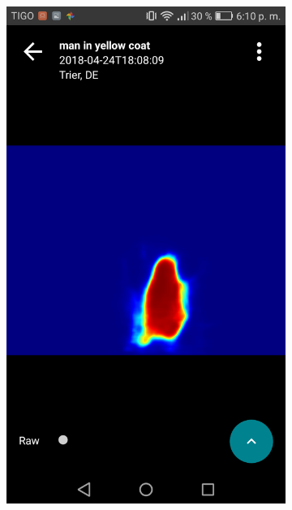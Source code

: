 \begin{figure}[!htbp]
    \centering
    \begin{multicols}{2}
    \begin{subfigure}[b]{\columnwidth}
            \centering
            \includegraphics[width=\textwidth]{./figures/dmn_app/views/8.png}
    \label{subfig:vis_mode}
    \end{subfigure}
    

\end{multicols}
\end{figure}
